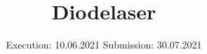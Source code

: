 

\subject{V60}
\title{Diodelaser}
\date{%
  Execution: 10.06.2021
  \hspace{3em}
  Submission: 30.07.2021
}



\maketitle
\thispagestyle{empty}
\tableofcontents
\newpage






% 

\printbibliography{}


